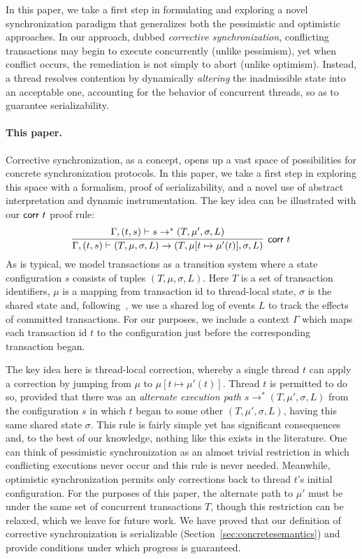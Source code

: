 %
In this paper, we take a first step in formulating and exploring a novel synchronization paradigm that generalizes both the pessimistic and optimistic approaches.
%
In our approach, dubbed \emph{corrective synchronization}, conflicting transactions may begin to execute concurrently (unlike pessimism), yet when conflict occurs, the remediation is not simply to abort (unlike optimism). Instead, a thread resolves contention by dynamically \emph{altering} the inadmissible state into an acceptable one, accounting for the behavior of concurrent threads, so as to guarantee serializability.


\paragraph{This paper.} Corrective synchronization, as a concept, opens up a vast space of possibilities for concrete synchronization protocols. In this paper, we take a first step in exploring this space with a formalism, proof of serializability, and a novel use of abstract interpretation and dynamic instrumentation.
%
The key idea can be illustrated with our ${\sf corr}\ t$ proof rule:
$$
\infer[\text{{\sf corr }} t]{\Gamma, (t,s) \vdash (T, \mu, \sigma, L) \rightarrow (T,\mu[t \mapsto \mu'(t)], \sigma, L)}{
   \Gamma, (t,s) \vdash
	s \rightarrow^{*} (T,\mu', \sigma, L)}
$$
As is typical, we model transactions as a transition system
where a state configuration $s$ consists of tuples $(T,\mu,\sigma,L)$.
Here $T$ is a set of transaction identifiers,  $\mu$ is a mapping from
transaction id to thread-local state, $\sigma$ is the shared state
and, following~\cite{KoskinenP15}, we use a shared log of events $L$ to track the
effects of committed transactions.
%
For our purposes, we include a context $\Gamma$ which maps each transaction
id $t$ to the configuration just before the corresponding transaction began.

The key idea here is thread-local correction, whereby a single
thread $t$ can apply a correction by jumping from $\mu$ to
$\mu[t \mapsto \mu'(t)]$. Thread $t$ is permitted to do so,
  provided that there was an \emph{alternate execution path}
  $s \rightarrow^{*} (T,\mu',\sigma,L)$ from the configuration $s$
  in which $t$ began to some other $(T,\mu',\sigma,L)$, having this
  same shared state $\sigma$.
%
This rule is fairly simple yet has significant consequences and, to
the best of our knowledge, nothing like this exists in the
literature. One can think of pessimistic synchronization as an almost
trivial restriction in which conflicting executions never occur and
this rule is never needed. Meanwhile, optimistic synchronization
permits only corrections back to thread $t$'s initial
configuration.
%
For the purposes of this paper, the alternate path to
$\mu'$ must be under the same set of concurrent transactions $T$,
though this restriction can be relaxed, which we leave for future work.
%
We have proved that our definition of corrective synchronization is serializable
(Section~\ref{sec:concretesemantics}) and provide conditions
under which progress is guaranteed.

